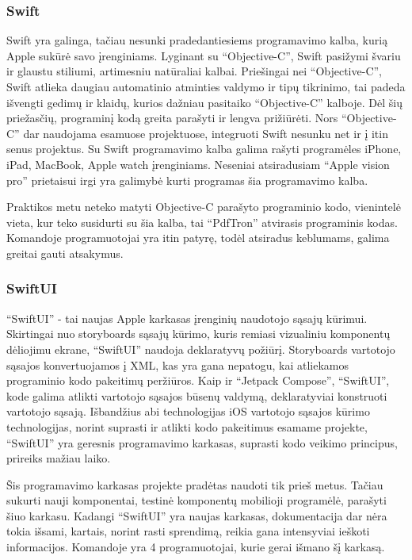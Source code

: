 \subsubsection{Swift}
Swift yra galinga, tačiau nesunki pradedantiesiems programavimo kalba, kurią Apple sukūrė savo įrenginiams. Lyginant su \enquote{Objective-C}, Swift pasižymi švariu ir glaustu stiliumi, artimesniu natūraliai kalbai. Priešingai nei \enquote{Objective-C}, Swift atlieka daugiau automatinio atminties valdymo ir tipų tikrinimo, tai padeda išvengti gedimų ir klaidų, kurios dažniau pasitaiko \enquote{Objective-C} kalboje. Dėl šių priežasčių, programinį kodą  greita parašyti ir lengva prižiūrėti. Nors \enquote{Objective-C} dar naudojama esamuose projektuose, integruoti Swift nesunku net ir į itin senus projektus. Su Swift programavimo kalba galima rašyti programėles iPhone, iPad, MacBook, Apple watch įrenginiams. Neseniai atsiradusiam \enquote{Apple vision pro} prietaisui irgi yra galimybė kurti programas šia programavimo kalba. 

Praktikos metu neteko matyti Objective-C parašyto programinio kodo, vienintelė vieta, kur teko susidurti su šia kalba, tai \enquote{PdfTron} atvirasis programinis kodas. Komandoje programuotojai yra itin patyrę, todėl atsiradus keblumams, galima greitai gauti atsakymus.
\subsubsection{SwiftUI}

\enquote{SwiftUI} - tai naujas Apple karkasas įrenginių naudotojo sąsajų kūrimui. Skirtingai nuo storyboards sąsajų kūrimo, kuris remiasi vizualiniu komponentų dėliojimu ekrane, \enquote{SwiftUI} naudoja deklaratyvų požiūrį. Storyboards vartotojo sąsajos konvertuojamos į XML,  kas yra gana nepatogu, kai atliekamos programinio kodo pakeitimų peržiūros. Kaip ir \enquote{Jetpack Compose}, \enquote{SwiftUI}, kode galima atlikti vartotojo sąsajos būsenų valdymą, deklaratyviai konstruoti vartotojo sąsają. Išbandžius abi technologijas iOS vartotojo sąsajos kūrimo technologijas, norint suprasti ir atlikti kodo pakeitimus esamame projekte, \enquote{SwiftUI} yra geresnis programavimo karkasas, suprasti kodo veikimo principus, prireiks mažiau laiko.

Šis programavimo karkasas projekte pradėtas naudoti tik prieš metus. Tačiau sukurti nauji komponentai, testinė komponentų mobilioji programėlė, parašyti šiuo karkasu. Kadangi \enquote{SwiftUI} yra naujas karkasas, dokumentacija dar nėra tokia išsami, kartais, norint rasti sprendimą, reikia gana intensyviai ieškoti informacijos. Komandoje yra 4 programuotojai, kurie gerai išmano šį karkasą.